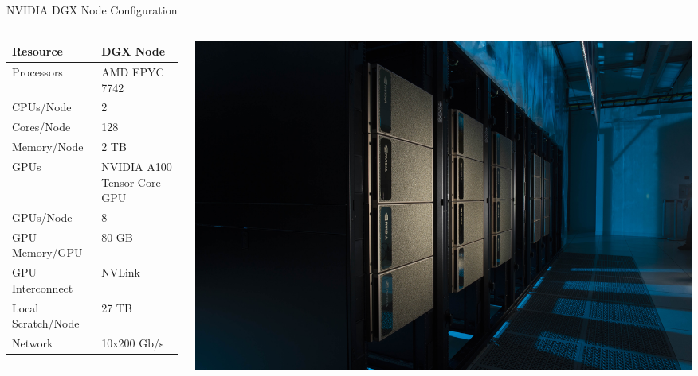 \begin{frame}{NVIDIA DGX Node Configuration}
\begin{columns}
\begin{column}{0.5\textwidth}
\begin{table}
\tiny
\begin{tabular}{ll}
\toprule
Resource & DGX Node \\
\midrule
Processors & AMD EPYC 7742 \\
CPUs/Node & 2 \\
Cores/Node & 128 \\
Memory/Node & 2 TB \\
GPUs & NVIDIA A100 Tensor Core GPU \\
GPUs/Node & 8 \\
GPU Memory/GPU & 80 GB \\
GPU Interconnect & NVLink \\
Local Scratch/Node & 27 TB \\
Network & 10x200 Gb/s \\
\bottomrule
\end{tabular}
\end{table}
\end{column}
\begin{column}{0.5\textwidth}
\begin{center}
\includegraphics[width=\textwidth]{figures/superpod.jpg}
\end{center}
\end{column}
\end{columns}
\end{frame}

